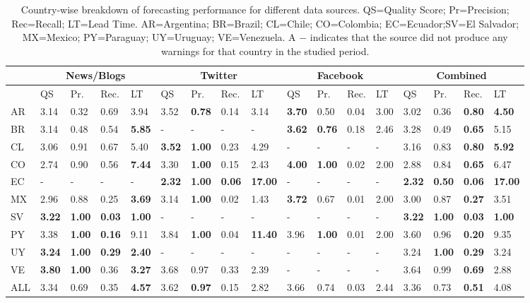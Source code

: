 \documentclass[letterpaper]{article}
\begin{document}
\newpage
\begin{table}
    \scriptsize
    \centering
    \caption{\label{tb:sourcewisecomparison} 
    \small Country-wise breakdown of forecasting performance for different data sources.
QS=Quality Score; Pr=Precision; Rec=Recall; LT=Lead Time.
AR=Argentina; BR=Brazil; CL=Chile; CO=Colombia; EC=Ecuador;SV=El Salvador; 
MX=Mexico; PY=Paraguay; UY=Uruguay; VE=Venezuela. A $-$
indicates that the source did not produce any warnings for that country
in the studied period.}
\begin{tabularx}{.9\textwidth}{*{17}{X}} %
        \toprule
        & \multicolumn{4}{c}{News/Blogs} & \multicolumn{4}{c}{Twitter} & \multicolumn{4}{c}{Facebook} & \multicolumn{4}{c}{Combined}\\
        \midrule
         & QS & Pr. & Rec. &LT & QS & Pr. & Rec. & LT & QS & Pr. & Rec. & LT & QS & Pr. & Rec. & LT\\
        \midrule
        AR &3.14&0.32&0.69&3.94&3.52&{\bf0.78}&0.14&3.14&{\bf3.70}&0.50&0.04&3.00&3.02&0.36&{\bf0.80}&{\bf4.50}\\
        BR &3.14&0.48&0.54&{\bf5.85}&-&-&-&-&{\bf3.62}&{\bf0.76}&0.18&2.46&3.28&0.49&{\bf0.65}&5.15\\
        CL &3.06&0.91&0.67&5.40&{\bf3.52}&{\bf1.00}&0.23&4.29&-&-&-&-&3.16&0.83&{\bf0.80}&{\bf5.92}\\
        CO &2.74&0.90&0.56&{\bf7.44}&3.30&{\bf1.00}&0.15&2.43&{\bf4.00}&{\bf1.00}&0.02&2.00&2.88&0.84&{\bf0.65}&6.47\\
        EC &-&-&-&-&{\bf2.32}&{\bf1.00}&{\bf0.06}&{\bf17.00}&-&-&-&-&{\bf2.32}&{\bf0.50}&{\bf0.06}&{\bf17.00}\\
        MX &2.96&0.88&0.25&{\bf3.69}&3.14&{\bf1.00}&0.02&1.43&{\bf3.72}&0.67&0.01&2.00&3.00&0.87&{\bf0.27}&3.51\\
        SV &{\bf3.22}&{\bf1.00}&{\bf0.03}&{\bf1.00}&-&-&-&-&-&-&-&-&{\bf3.22}&{\bf1.00}&{\bf0.03}&{\bf1.00}\\
        PY &3.38&{\bf1.00}&{\bf0.16}&9.11&3.84&{\bf1.00}&0.04&{\bf11.40}&3.96&{\bf1.00}&0.01&2.00&3.60&0.96&{\bf0.20}&9.35\\
        UY &{\bf3.24}&{\bf1.00}&{\bf0.29}&{\bf2.40}&-&-&-&-&-&-&-&-&3.24&{\bf1.00}&{\bf0.29}&3.24\\
        VE &{\bf3.80}&{\bf1.00}&0.36&{\bf3.27}&3.68&0.97&0.33&2.39&-&-&-&-&3.64&0.99&{\bf0.69}&2.88\\
        ALL &3.34&0.69&0.35&{\bf4.57}&3.62&{\bf0.97}&0.15&2.82&3.66&0.74&0.03&2.44&3.36&0.73&{\bf0.51}&4.08\\
        \bottomrule
    \end{tabularx}
\end{table}
\newpage
~
\newpage
\end{document}
